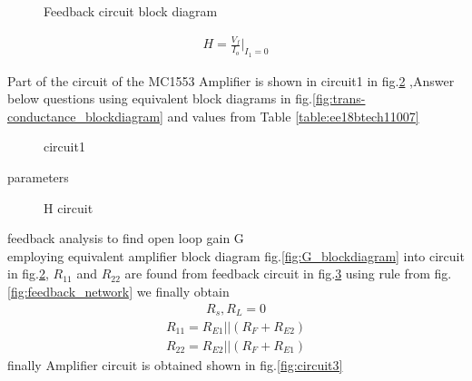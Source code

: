 \begin{enumerate}[label=\thesubsection.\arabic*.,ref=\thesubsection.\theenumi]
{\begin{figure}[!ht]
\begin{center}
		\resizebox{\columnwidth}{!}{}
	\end{center}
\caption{Feedback circuit block diagram}
\label{fig:H_blockdiagram}
\end{figure}
\begin{align}
    H=\frac{V_f}{I_o}|_{I_{1}=0} 
\end{align}

 \item Part of the circuit of the MC1553 Amplifier is shown in circuit1 in  fig.\ref{fig:circuit1} ,Answer below questions using equivalent block diagrams in fig.\ref{fig:trans-conductance_blockdiagram} and  values from Table \ref{table:ee18btech11007}
 \begin{figure}[!ht]
	\begin{center}
		
		\resizebox{\columnwidth}{!}{}
	\end{center}
\caption{circuit1}
\label{fig:circuit1}
\end{figure}
 
\begin{table}[!ht]
\centering

\caption{parameters}
\label{table:ee18btech11007}
\end{table}
\begin{figure}[!ht]
	\begin{center}
		
		\resizebox{\columnwidth}{!}{}
	\end{center}
\caption{H circuit}
\label{fig:circuit2}
\end{figure}
\item feedback analysis to find open loop gain G 
\\
\solution employing equivalent amplifier block diagram fig.\ref{fig:G_blockdiagram} into circuit in  fig.\ref{fig:circuit1}, $R_{11}$ and $R_{22}$ are found from feedback circuit in fig.\ref{fig:circuit2} using rule from fig.\ref{fig:feedback_network} we finally obtain
\begin{align}
    R_s,R_L=0
\end{align}
\begin{align}
    R_{11}=R_{E1}||(R_F+R_{E2})
\end{align}
\begin{align}
    R_{22}=R_{E2}||(R_F+R_{E1})
\end{align}
 finally Amplifier circuit is obtained shown in fig.\ref{fig:circuit3}
 \begin{figure}[!ht]
	\begin{center}
		

\end{center}
\end{figure}}
\end{enumerate}
